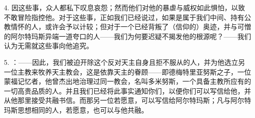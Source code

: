 4. 因这些事，众人都私下叹息哀怨；然而他们对他的暴虐与威权如此惧怕，以致不敢冒险指控他。对于这些事，正如我们已经说过，如果是属于我们中间、持有公教情怀的人，或许会予以计较；但对于一个已经背叛了（信仰的）奥迹，并与可憎的阿尔特玛斯异端一道夸口的人——我们为何要迟疑不揭发他的根源呢？——我们认为无需就这些事向他追究。\par

5. ：——因此，我们被迫开除这个反对天主自身且拒不服从的人，并为他选立另一位主教来牧养天主教会，这是依靠天主的眷顾——即德梅特里亚努斯之子，一位蒙福记忆者，他曾杰出地治理过同一教会，名叫多米努斯，一个具备主教所应有的一切高贵品质的人。并且我们已经将此事实通知你们，以便你们可以写信给他，并从他那里接受共融书信。而那另一位若愿意，可以写信给阿尔特玛斯；凡与阿尔特玛斯思想相同的人，若愿意，也可以与他共融。\par

